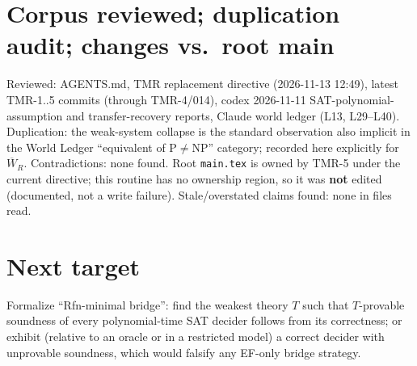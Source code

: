 \documentclass[11pt]{article}
\begin{document}
\section{Corpus reviewed; duplication audit; changes vs.\ root main}
Reviewed: AGENTS.md, TMR replacement directive (2026-11-13 12:49), latest TMR-1..5 commits (through TMR-4/014),
codex 2026-11-11 SAT-polynomial-assumption and transfer-recovery reports, Claude world ledger (L13, L29--L40).
Duplication: the weak-system collapse is the standard observation also implicit in the World Ledger
``equivalent of P$\ne$NP'' category; recorded here explicitly for $\overline W_R$. Contradictions: none found.
Root \texttt{main.tex} is owned by TMR-5 under the current directive; this routine has no ownership region, so it was
\textbf{not} edited (documented, not a write failure).
Stale/overstated claims found: none in files read.

\section{Next target}
Formalize ``Rfn-minimal bridge'': find the weakest theory $T$ such that $T$-provable soundness of every
polynomial-time SAT decider follows from its correctness; or exhibit (relative to an oracle or in a restricted
model) a correct decider with unprovable soundness, which would falsify any EF-only bridge strategy.

\end{document}
